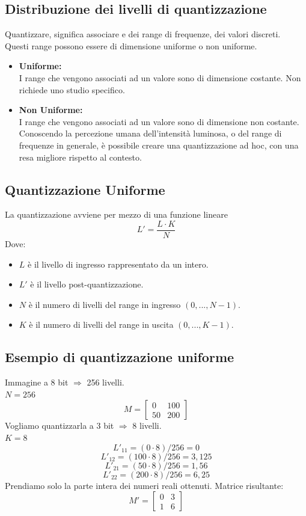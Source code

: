 \documentclass{report}
\begin{document}
	\subsection{Distribuzione dei livelli di quantizzazione}
	Quantizzare, significa associare e dei range di frequenze, dei valori discreti.\\
	Questi range possono essere di dimensione uniforme o non uniforme.
	\begin{itemize}
		\item \textbf{Uniforme:}\\
		      I range che vengono associati ad un valore sono di dimensione costante. Non richiede uno studio specifico.
		\item \textbf{Non Uniforme:}\\
		      I range che vengono associati ad un valore sono di dimensione non costante. Conoscendo la percezione umana dell'intensità luminosa, o del range di frequenze in generale, è possibile creare una quantizzazione ad hoc, con una resa migliore rispetto al contesto.
	\end{itemize}
		
	\subsection{Quantizzazione Uniforme}
	La quantizzazione avviene per mezzo di una funzione lineare
	$$
	L' = \frac{L \cdot K}{N}
	$$
	Dove:
	\begin{itemize}
		\item $L$ è il livello di ingresso rappresentato da un intero.
		\item $L'$ è il livello post-quantizzazione.
		\item $N$ è il numero di livelli del range in ingresso $(0, ..., N-1)$.
		\item $K$ è il numero di livelli del range in uscita $(0, ..., K-1)$.
	\end{itemize}
	\subsection{Esempio di quantizzazione uniforme}
	Immagine a 8 bit $\Rightarrow$ 256 livelli.\\
	$N = 256$
	$$
	M = 
	\begin{bmatrix}
		0  & 100 \\
		50 & 200 
	\end{bmatrix}
	$$
	Vogliamo quantizzarla a 3 bit $\Rightarrow$ 8 livelli.\\
	$K = 8$
	$$
	L'_{11} = (0 \cdot 8)/256 = 0
	$$
	$$
	L'_{12} = (100 \cdot 8)/256 = 3,125
	$$
	$$
	L'_{21} = (50 \cdot 8)/256 = 1,56
	$$
	$$
	L'_{22} = (200 \cdot 8)/256 = 6,25
	$$
	Prendiamo solo la parte intera dei numeri reali ottenuti. Matrice risultante:
	$$
	M' = 
	\begin{bmatrix}
		0 & 3 \\
		1 & 6 
	\end{bmatrix}
	$$
		
\end{document}
